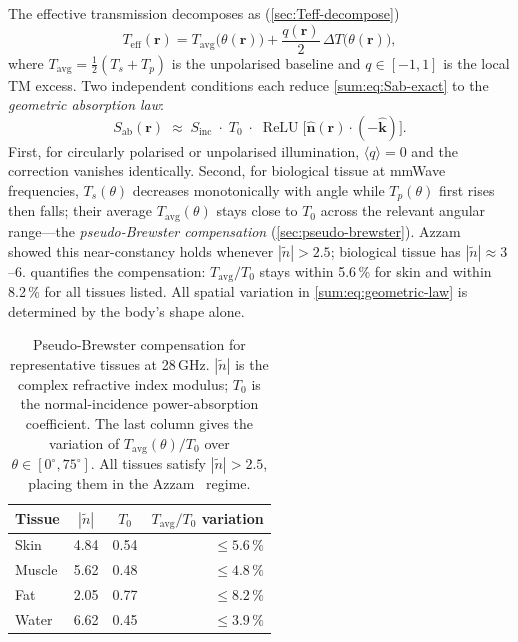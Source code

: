 \documentclass[11pt,a4paper]{article}
\theoremstyle{definition}      %
\newcommand{\khat}{\hat{\bm{k}}}
\newcommand{\nhat}{\hat{\bm{n}}}
\newcommand{\rr}{\mathbf{r}}
\newcommand{\Sinc}{S_{\mathrm{inc}}}
\newcommand{\Sab}{S_{\mathrm{ab}}}
\newcommand{\Teff}{T_{\mathrm{eff}}}
\newcommand{\Tavg}{T_{\mathrm{avg}}}
\newcommand{\ntilde}{\tilde{n}}
\DeclareMathOperator{\ReLU}{ReLU}
\begin{document}
The effective transmission decomposes as (\cref{sec:Teff-decompose})
\begin{equation}\label{sum:eq:Teff-decomp}
  \Teff(\rr) = \Tavg\!\bigl(\theta(\rr)\bigr)
    + \frac{q(\rr)}{2}\,\Delta T\!\bigl(\theta(\rr)\bigr),
\end{equation}
where $\Tavg=\tfrac{1}{2}(T_s+T_p)$ is the unpolarised baseline and
$q\in[-1,1]$ is the local TM excess.
Two independent conditions each reduce \cref{sum:eq:Sab-exact} to the
\emph{geometric absorption law}:
\begin{equation}\label{sum:eq:geometric-law}
  \boxed{\Sab(\rr)
    \;\approx\; \Sinc\;\cdot\; T_0\;\cdot\;
    \ReLU\!\bigl[\nhat(\rr)\cdot(-\khat)\bigr].}
\end{equation}
First, for circularly polarised or unpolarised illumination,
$\langle q\rangle=0$ and the correction vanishes identically.
Second, for biological tissue at mmWave frequencies, $T_s(\theta)$
decreases monotonically with angle while $T_p(\theta)$ first rises then
falls; their average $\Tavg(\theta)$ stays close to $T_0$ across the
relevant angular range—the \emph{pseudo-Brewster compensation}
(\cref{sec:pseudo-brewster}).
Azzam~\cite{Azzam2015} showed this near-constancy holds whenever
$|\ntilde|>2.5$; biological tissue has $|\ntilde|\approx3$--6.
 quantifies the compensation: $\Tavg/T_0$ stays
within 5.6\,\% for skin and within 8.2\,\% for all tissues listed.
All spatial variation in \cref{sum:eq:geometric-law} is determined by
the body's shape alone.

\begin{table}[!htbp]
\centering
\caption{Pseudo-Brewster compensation for representative tissues at
  28\,GHz.  $|\ntilde|$ is the complex refractive index modulus;
  $T_0$ is the normal-incidence power-absorption coefficient.
  The last column gives the variation of $\Tavg(\theta)/T_0$ over
  $\theta\in[0^\circ,75^\circ]$.  All tissues satisfy $|\ntilde|>2.5$,
  placing them in the Azzam~\cite{Azzam2015} regime.}
  \label{tab:sum:materials}
\begin{tabular}{lccr}
\toprule
Tissue & $|\ntilde|$ & $T_0$ & $\Tavg/T_0$ variation \\
\midrule
Skin   & 4.84 & 0.54 & $\le 5.6\,\%$ \\
Muscle & 5.62 & 0.48 & $\le 4.8\,\%$ \\
Fat    & 2.05 & 0.77 & $\le 8.2\,\%$ \\
Water  & 6.62 & 0.45 & $\le 3.9\,\%$ \\
\bottomrule
\end{tabular}
\end{table}
\end{document}
